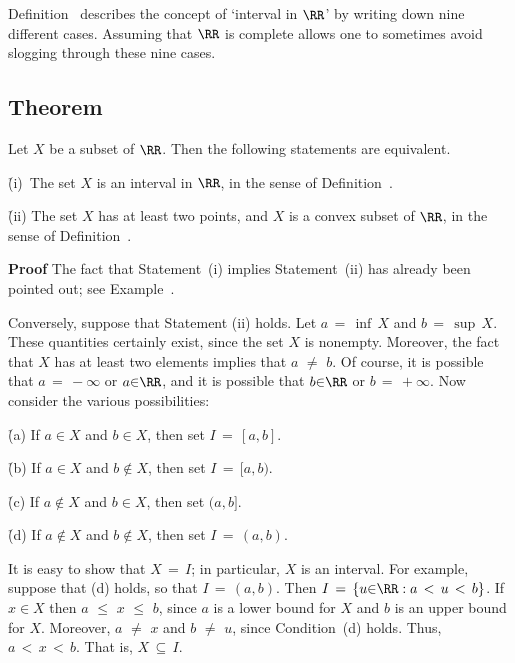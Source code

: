 {\V
\V

        Definition~ describes the concept of `interval in ${\RR}$' by writing down nine different cases.
    Assuming that ${\RR}$ is complete allows one to sometimes avoid slogging through these nine cases.

\V

            \subsection{\small{\bf Theorem}}
            \label{ThmB30.160}

\V

        Let $X$ be a subset of ${\RR}$. Then the following statements are equivalent.

        \h (i)\, The set $X$ is an interval in ${\RR}$, in the sense of Definition~.

        \h (ii) The set $X$ has at least two points, and $X$ is a convex subset of ${\RR}$, in the sense of Definition~.

\V

        {\bf Proof} The fact that Statement~(i) implies Statement~(ii) has already been pointed out; see Example~.

        Conversely, suppose that Statement (ii) holds. Let $a \,=\, {\inf}\,X$ and $b \,=\, {\sup}\,X$.
    These quantities certainly exist, since the set $X$ is nonempty. Moreover, the fact that $X$ has at least two elements implies that $a \,\,{\neq}\,\, b$.
    Of course, it is possible that $a \,=\, -{\infty}$ or $a{\in}{\RR}$, and it is possible that $b{\in}{\RR}$ or $b \,=\, +{\infty}$.
    Now consider the various possibilities:

    \h (a) If $a{\in}X$ and $b{\in}X$, then set $I \,=\, [a,b]$.

    \h (b) If $a{\in}X$ and $b \not \in X$, then set $I \,=\, [a,b)$.

    \h (c) If $a \not \in X$ and $b{\in}X$, then set $(a,b]$.

    \h (d) If $a \not \in X$ and $b \not \in X$, then set $I \,=\, (a,b)$.

\noindent It is easy to show that $X \,=\, I$; in particular, $X$ is an interval.
    For example, suppose that (d) holds, so that $I \,=\, (a,b)$. Then $I \,=\, \{u{\in}{\RR}:a\,<\,u\,<\,b\}$.
    If $x{\in}X$ then $a\,\,{\leq}\,\,x\,\,{\leq}\,\,b$, since $a$ is a lower bound for $X$ and $b$ is an upper bound for $X$.
    Moreover, $a \,\,{\neq}\,\, x$ and $b \,\,{\neq}\,\, u$, since Condition~(d) holds.
    Thus, $a\,<\,x\,<\,b$. That is, $X \,{\subseteq}\, I$.

}
